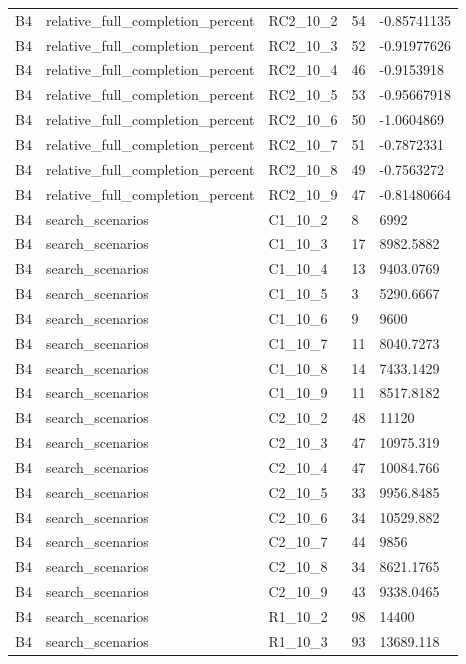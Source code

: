 \begin{longtable}{lllll}
B4 & relative\_full\_completion\_percent & RC2\_10\_2 & 54 & -0.85741135 \\
B4 & relative\_full\_completion\_percent & RC2\_10\_3 & 52 & -0.91977626 \\
B4 & relative\_full\_completion\_percent & RC2\_10\_4 & 46 & -0.9153918 \\
B4 & relative\_full\_completion\_percent & RC2\_10\_5 & 53 & -0.95667918 \\
B4 & relative\_full\_completion\_percent & RC2\_10\_6 & 50 & -1.0604869 \\
B4 & relative\_full\_completion\_percent & RC2\_10\_7 & 51 & -0.7872331 \\
B4 & relative\_full\_completion\_percent & RC2\_10\_8 & 49 & -0.7563272 \\
B4 & relative\_full\_completion\_percent & RC2\_10\_9 & 47 & -0.81480664 \\
B4 & search\_scenarios & C1\_10\_2 & 8 & 6992 \\
B4 & search\_scenarios & C1\_10\_3 & 17 & 8982.5882 \\
B4 & search\_scenarios & C1\_10\_4 & 13 & 9403.0769 \\
B4 & search\_scenarios & C1\_10\_5 & 3 & 5290.6667 \\
B4 & search\_scenarios & C1\_10\_6 & 9 & 9600 \\
B4 & search\_scenarios & C1\_10\_7 & 11 & 8040.7273 \\
B4 & search\_scenarios & C1\_10\_8 & 14 & 7433.1429 \\
B4 & search\_scenarios & C1\_10\_9 & 11 & 8517.8182 \\
B4 & search\_scenarios & C2\_10\_2 & 48 & 11120 \\
B4 & search\_scenarios & C2\_10\_3 & 47 & 10975.319 \\
B4 & search\_scenarios & C2\_10\_4 & 47 & 10084.766 \\
B4 & search\_scenarios & C2\_10\_5 & 33 & 9956.8485 \\
B4 & search\_scenarios & C2\_10\_6 & 34 & 10529.882 \\
B4 & search\_scenarios & C2\_10\_7 & 44 & 9856 \\
B4 & search\_scenarios & C2\_10\_8 & 34 & 8621.1765 \\
B4 & search\_scenarios & C2\_10\_9 & 43 & 9338.0465 \\
B4 & search\_scenarios & R1\_10\_2 & 98 & 14400 \\
B4 & search\_scenarios & R1\_10\_3 & 93 & 13689.118 \\

\end{longtable}
